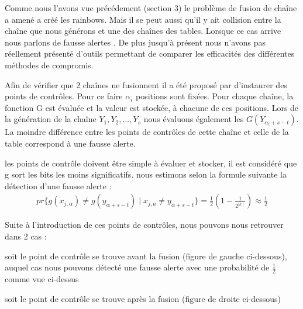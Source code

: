 	Comme nous l'avons vue précédement (section 3) le problème de fusion de chaîne a amené a créé les \glspl{rainbow}. Mais il se peut aussi qu'il y ait collision entre la chaîne que nous générons et une des chaînes des tables. Lorsque ce cas arrive nous parlons de fausse alertes \cite{checkpoints}.
	De plus jusqu'à présent nous n'avons pas réellement présenté d'outils permettant de comparer les efficacités des différentes méthodes de compromis.

	Afin de vérifier que 2 chaînes ne fusionnent il a été proposé par \cite{checkpoints} d'instaurer des points de contrôles. Pour ce faire $\alpha_i$ positions sont fixées. Pour chaque chaîne, la fonction G est évaluée et la valeur est stockée, à chacune de ces positions. Lors de la génération de la chaîne $Y_1,Y_2,...,Y_s$ nous évaluons également les $G(Y_{\alpha_i+s-t})$. La moindre différence entre les points de contrôles de cette chaîne et celle de la table correspond à une fausse alerte.


	\bigskip
	
	les points de contrôle doivent être simple à évaluer et stocker, il est considéré que g sort les bits les moins significatifs. nous estimons selon la formule suivante la détection d'une fausse alerte :
\begin{align*}
pr\{g(x_{j,\alpha}) \neq g(y_{\alpha +s-t}) \mid x_{j,a} \neq y_{\alpha+s-t}\}=\frac{1}{2}(1-\frac{1}{2^{\mid k \mid}}) \approx \frac{1}{2}
\end{align*}

	Suite à l'introduction de ces points de contrôles, nous pouvons nous retrouver dans 2 cas :
	\bi
\item soit le point de contrôle se trouve avant la fusion (figure de gauche ci-dessous), auquel cas nous pouvons détecté une fausse alerte avec une probabilité de $\frac{1}{2}$ comme vue ci-dessus
\item soit le point de contrôle se trouve après la fusion (figure de droite ci-dessous)
	\ei

